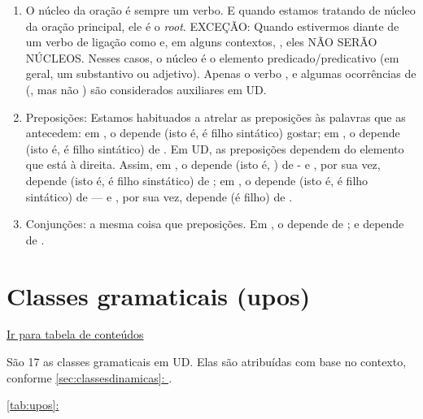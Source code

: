 \documentclass[output=paper,colorlinks,citecolor=brown]{langscibook}
\newcommand*{\fullref}[1]{\hyperref[{#1}]{\autoref*{#1}: \nameref*{#1}}} %
\begin{document}
	\begin{enumerate}
		\item O núcleo da oração é sempre um verbo. E quando estamos tratando de núcleo da oração principal, ele é o \emph{root}. EXCEÇÃO: Quando estivermos diante de um verbo de ligação como  e, em alguns contextos, , eles NÃO SERÃO NÚCLEOS. Nesses casos, o núcleo é o elemento predicado/predicativo (em geral, um substantivo ou adjetivo). Apenas o verbo , e algumas ocorrências de  (, mas não ) são considerados auxiliares em UD. 

		\item Preposições: Estamos habituados a atrelar as preposições às palavras que as antecedem: em , o  depende (isto é, é filho sintático) gostar; em , o  depende (isto é, é filho sintático) de . Em UD, as preposições dependem do elemento que está à direita. Assim, em , o  depende (isto é, ) de  - e , por sua vez, depende (isto é, é filho sinstático) de ; em , o  depende (isto é, é filho sintático) de  — e , por sua vez, depende (é filho) de . 

		\item Conjunções: a mesma coisa que preposições. Em , o  depende de ; e  depende de .
	\end{enumerate}


\chapter{Classes gramaticais (upos)}\label{sec:upos}

\hyperlink{toc}{Ir para tabela de conteúdos\\}

São 17 as classes gramaticais em UD. Elas são atribuídas com base no contexto, conforme \fullref{sec:classesdinamicas}.

\fullref{tab:upos}
\end{document}
